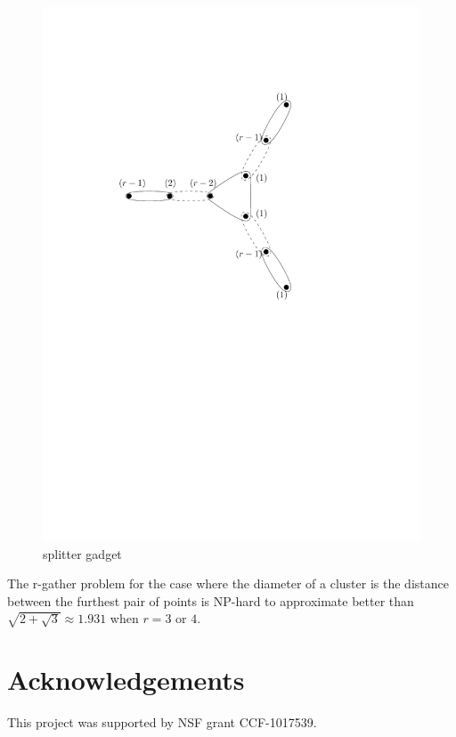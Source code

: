 \documentclass[11pt]{article}
\begin{document}
\begin{figure}[htbp]
\begin{center}
\includegraphics[scale=.6]{figs/splittergadget}
\caption{splitter gadget}
\label{fig:splittercircuit}
\end{center}
\end{figure}

\begin{theorem}
The r-gather problem for the case where the diameter of a cluster is the distance between the furthest pair of points is NP-hard to approximate better than $\sqrt{2+\sqrt{3}} \approx 1.931$ when $r=3$ or $4$.
\end{theorem}





\section{Acknowledgements}
This project was supported by NSF grant CCF-1017539.

\begin{small}


\end{small}
\end{document}

